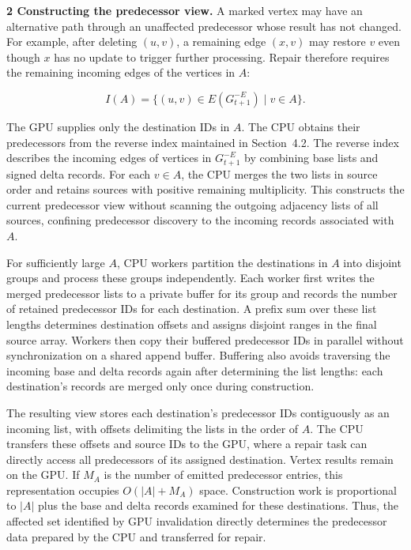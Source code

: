 \textbf{2 Constructing the predecessor view.} A marked vertex may have an alternative path through an unaffected predecessor whose result has not changed. For example, after deleting $(u,v)$, a remaining edge $(x,v)$ may restore $v$ even though $x$ has no update to trigger further processing. Repair therefore requires the remaining incoming edges of the vertices in $A$:

\begin{equation}
I(A)=\{(u,v)\in E(G_{t+1}^{-E})\mid v\in A\}.
\tag{5.1}
\end{equation}

The GPU supplies only the destination IDs in $A$. The CPU obtains their predecessors from the reverse index maintained in Section~4.2. The reverse index describes the incoming edges of vertices in $G_{t+1}^{-E}$ by combining base lists and signed delta records. For each $v\in A$, the CPU merges the two lists in source order and retains sources with positive remaining multiplicity. This constructs the current predecessor view without scanning the outgoing adjacency lists of all sources, confining predecessor discovery to the incoming records associated with $A$.

For sufficiently large $A$, CPU workers partition the destinations in $A$ into disjoint groups and process these groups independently. Each worker first writes the merged predecessor lists to a private buffer for its group and records the number of retained predecessor IDs for each destination. A prefix sum over these list lengths determines destination offsets and assigns disjoint ranges in the final source array. Workers then copy their buffered predecessor IDs in parallel without synchronization on a shared append buffer. Buffering also avoids traversing the incoming base and delta records again after determining the list lengths: each destination's records are merged only once during construction.

The resulting view stores each destination's predecessor IDs contiguously as an incoming list, with offsets delimiting the lists in the order of $A$. The CPU transfers these offsets and source IDs to the GPU, where a repair task can directly access all predecessors of its assigned destination. Vertex results remain on the GPU. If $M_A$ is the number of emitted predecessor entries, this representation occupies $O(|A|+M_A)$ space. Construction work is proportional to $|A|$ plus the base and delta records examined for these destinations. Thus, the affected set identified by GPU invalidation directly determines the predecessor data prepared by the CPU and transferred for repair.

